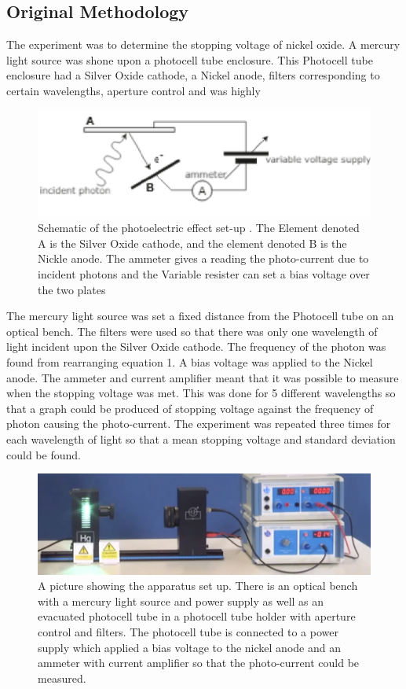 \documentclass[12pt]{article}
\begin{document}
\subsection{Original Methodology}
The experiment was to determine the stopping voltage of nickel oxide. A mercury light source was shone upon a photocell tube enclosure. This Photocell tube enclosure had a Silver Oxide cathode, a Nickel anode, filters corresponding to certain wavelengths, aperture control and was highly 
    \begin{figure}[ht!]
        \includegraphics[scale=0.5]{Screenshot (198).png}
        \caption{Schematic of the photoelectric effect set-up \cite{university physics}. The Element denoted A is the Silver Oxide cathode, and the element denoted B is the Nickle anode. The ammeter gives a reading the photo-current due to incident photons and the Variable resister can set a bias voltage over the two plates}
        \label{fig:1}
    \end{figure}
The mercury light source was set a fixed distance from the Photocell tube on an optical bench. The filters were used so that there was only one wavelength of light incident upon the Silver Oxide cathode. The frequency of the photon was found from rearranging equation 1. A bias voltage was
applied to the Nickel anode. The ammeter and current amplifier meant that it was possible to measure when the stopping voltage was met. This was done for 5 different wavelengths so that a graph could be produced of stopping voltage against the frequency of photon causing the photo-current. The experiment was repeated three times for each wavelength of light so that a mean
stopping voltage and standard deviation could be found.
\begin{figure}[ht!]
    \includegraphics[scale=0.4]{Photocell tube picture.png}
    \caption{A picture showing the apparatus set up. There is an optical bench with a mercury light source and power supply as well as an evacuated photocell tube in a photocell tube holder with aperture control and filters. The photocell tube is connected to a power supply which applied a bias voltage to the nickel anode and an ammeter with current amplifier so that the photo-current could be measured.}
    \label{fig:2}
\end{figure}
\end{document}
